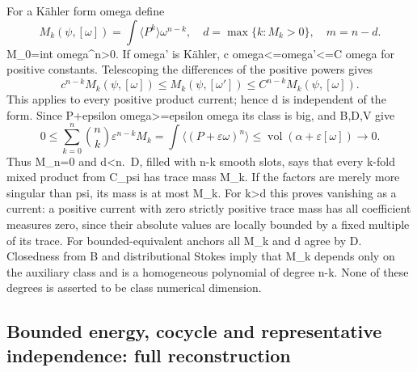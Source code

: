 \documentclass[
]{article}
\begin{document}
For a Kähler form omega define \[
M_k(\psi,[\omega])=\int\langle P^k\rangle\omega^{n-k},\quad
d=\max\{k:M_k>0\},\quad m=n-d.
\] M\_0=int omega\^{}n\textgreater0. If omega' is Kähler, c
omega\textless=omega'\textless=C omega for positive constants.
Telescoping the differences of the positive powers gives \[
c^{n-k}M_k(\psi,[\omega])\leq M_k(\psi,[\omega'])
\leq C^{n-k}M_k(\psi,[\omega]).
\] This applies to every positive product current; hence d is
independent of the form. Since P+epsilon omega\textgreater=epsilon omega
its class is big, and B,D,V give \[
0\leq\sum_{k=0}^n\binom nk\varepsilon^{n-k}M_k
=\int\langle(P+\varepsilon\omega)^n\rangle
\leq\operatorname{vol}(\alpha+\varepsilon[\omega])\longrightarrow0.
\] Thus M\_n=0 and d\textless n.~D, filled with n-k smooth slots, says
that every k-fold mixed product from C\_psi has trace mass M\_k. If the
factors are merely more singular than psi, its mass is at most M\_k. For
k\textgreater d this proves vanishing as a current: a positive current
with zero strictly positive trace mass has all coefficient measures
zero, since their absolute values are locally bounded by a fixed
multiple of its trace. For bounded-equivalent anchors all M\_k and d
agree by D. Closedness from B and distributional Stokes imply that M\_k
depends only on the auxiliary class and is a homogeneous polynomial of
degree n-k. None of these degrees is asserted to be class numerical
dimension.

\subsection{Bounded energy, cocycle and representative independence:
full
reconstruction}\label{bounded-energy-cocycle-and-representative-independence-full-reconstruction}
\end{document}
